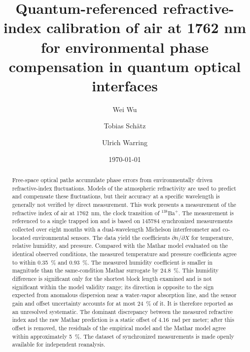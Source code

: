 \documentclass[aps,prapplied,reprint,groupedaddress,twocolumn,superscriptaddress,linenumbers]{revtex4-2}
\begin{document}
\preprint{}

\title{Quantum-referenced refractive-index calibration of air at 1762 nm for environmental phase compensation in quantum optical interfaces}

\author{Wei Wu}
\author{Tobias Sch{\"a}tz}
\author{Ulrich Warring}

\date{\today}

\begin{abstract}
Free-space optical paths accumulate phase errors from environmentally driven refractive-index fluctuations. Models of the atmospheric refractivity are used to predict and compensate these fluctuations, but their accuracy at a specific wavelength is generally not verified by direct measurement. This work presents a measurement of the refractive index of air at \SI{1762}{\nano\meter}, the clock transition of $^{138}\mathrm{Ba}^+$. The measurement is referenced to a single trapped ion and is based on \num{145784} synchronized measurements collected over eight months with a dual-wavelength Michelson interferometer and co-located environmental sensors. The data yield the coefficients $\partial n/\partial X$ for temperature, relative humidity, and pressure. Compared with the Mathar model evaluated on the identical observed conditions, the measured temperature and pressure coefficients agree to within \SI{0.35}{\percent} and \SI{0.93}{\percent}. The measured humidity coefficient is smaller in magnitude than the same-condition Mathar surrogate by \SI{24.8}{\percent}. This humidity difference is significant only for the shortest block length examined and is not significant within the model validity range; its direction is opposite to the sign expected from anomalous dispersion near a water-vapor absorption line, and the sensor gain and offset uncertainty accounts for at most \SI{24}{\percent} of it. It is therefore reported as an unresolved systematic. The dominant discrepancy between the measured refractive index and the raw Mathar prediction is a static offset of \SI{4.16}{\radian} per meter; after this offset is removed, the residuals of the empirical model and the Mathar model agree within approximately \SI{5}{\percent}. The dataset of synchronized measurements is made openly available for independent reanalysis.
\end{abstract}
\end{document}
